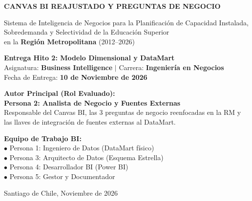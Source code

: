 \documentclass[11pt,a4paper]{article}
\begin{document}
\begin{titlepage}
    \centering
    \vspace*{1cm}
    {\Huge \bfseries \color{primaryblue}
      CANVAS BI REAJUSTADO Y PREGUNTAS DE NEGOCIO\par}
    \vspace{0.4cm}
    {\LARGE \color{secondaryblue}
      Sistema de Inteligencia de Negocios para la Planificación de Capacidad
      Instalada, Sobredemanda y Selectividad de la Educación Superior\\
      en la \textbf{Región Metropolitana} (2012--2026)\par}
    \vspace{1cm}

    \begin{tcolorbox}[colback=lightbg, colframe=primaryblue, width=\textwidth, arc=3mm]
        \centering
        \large \textbf{Entrega Hito 2: Modelo Dimensional y DataMart}\\[2mm]
        \normalsize Asignatura: \textbf{Business Intelligence} $|$
        Carrera: \textbf{Ingeniería en Negocios}\\[1mm]
        Fecha de Entrega: \textbf{10 de Noviembre de 2026}
    \end{tcolorbox}

    \vspace{2cm}
    \begin{minipage}{0.45\textwidth}
        \textbf{Autor Principal (Rol Evaluado):}\\
        \textbf{\color{primaryblue}Persona 2: Analista de Negocio y Fuentes Externas}\\
        Responsable del Canvas BI, las 3 preguntas de negocio reenfocadas
        en la RM y las llaves de integración de fuentes externas al DataMart.
    \end{minipage}
    \hfill
    \begin{minipage}{0.45\textwidth}
        \textbf{Equipo de Trabajo BI:}\\
        $\bullet$ Persona 1: Ingeniero de Datos (DataMart físico)\\
        $\bullet$ Persona 3: Arquitecto de Datos (Esquema Estrella)\\
        $\bullet$ Persona 4: Desarrollador BI (Power BI)\\
        $\bullet$ Persona 5: Gestor y Documentador
    \end{minipage}

    \vfill
    {\small \color{darkgray} Santiago de Chile, Noviembre de 2026}\par
\end{titlepage}
\end{document}
